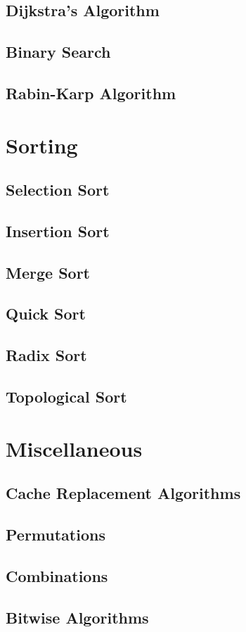 \subsection{Dijkstra's Algorithm}


\subsection{Binary Search}

\subsection{Rabin-Karp Algorithm}

\section{Sorting}

\subsection{Selection Sort}

\subsection{Insertion Sort}

\subsection{Merge Sort}

\subsection{Quick Sort}

\subsection{Radix Sort}

\subsection{Topological Sort}

\section{Miscellaneous}

\subsection{Cache Replacement Algorithms}

\subsection{Permutations}

\subsection{Combinations}

\subsection{Bitwise Algorithms}


